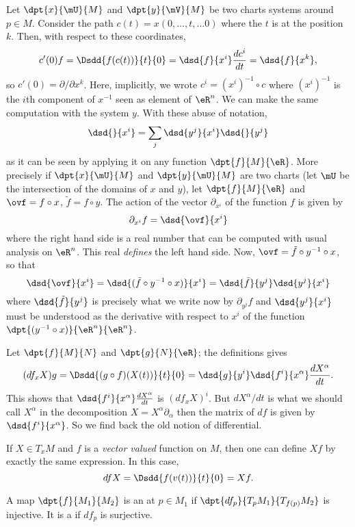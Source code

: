 Let $\dpt{x}{\mU}{M}$ and $\dpt{y}{\mV}{M}$ be two charts systems around $p\in M$. Consider the path $c(t)=x(0,\ldots,t,\ldots 0)$ where the $t$ is at the position $k$. Then, with respect to these coordinates,
\[
  c'(0)f=\Dsdd{ f(c(t))  }{t}{0}=\dsd{f}{x^i}\frac{dc^i}{dt}=\dsd{f}{x^k},
\]
so $c'(0)=\partial/\partial x^k$. Here, implicitly, we wrote $c^i=(x^i)^{-1}\circ c$ where $(x^i)^{-1}$ is the $i$th component of $x^{-1}$ seen as element of $\eR^n$. We can make the same computation with the system $y$. With these abuse of notation,
\begin{equation}
   \dsd{}{x^i}=\sum_j\dsd{y^j}{x^i}\dsd{}{y^j}
\end{equation}
as it can be seen by applying it on any function $\dpt{f}{M}{\eR}$. More precisely if $\dpt{x}{\mU}{M}$ and $\dpt{y}{\mU}{M}$ are two charts (let $\mU$ be the intersection of the domains of $x$ and $y$), let $\dpt{f}{M}{\eR}$ and $\ovf=f\circ x$, $\tilde f =f\circ y$. The action of the vector $\partial_{x^i}$ of the function $f$ is given by
\[
  \partial_{x^i}f=\dsd{\ovf}{x^i}
\]
where the right hand side is a real number that can be computed with usual analysis on $\eR^n$. This real \emph{defines} the left hand side. Now, $\ovf=\tilde f \circ y^{-1}\circ x$, so that
\[
   \dsd{\ovf}{x^i}=\dsd{ (\tilde f \circ y^{-1}\circ x) }{x^i}=\dsd{\tilde f }{y^j}\dsd{y^j}{x^i}
\]
where $\dsd{\tilde f }{y^j}$ is precisely what we write now by $\partial_{y^j}f$ and $\dsd{y^j}{x^i}$ must be understood as the derivative with respect to $x^i$ of the function $\dpt{(y^{-1}\circ x)}{\eR^n}{\eR^n}$.

Let $\dpt{f}{M}{N}$ and $\dpt{g}{N}{\eR}$; the definitions gives
\[
  (df_xX)g=\Dsdd{(g\circ f)(X(t))}{t}{0}
          =\dsd{g}{y^i}\dsd{f^i}{x^{\alpha}}\frac{dX^{\alpha}}{dt}.
\]
This shows that $\dsd{f^i}{x^{\alpha}}\frac{dX^{\alpha}}{dt}$ is $(df_xX)^i$.  But $dX^{\alpha}/dt$ is what we should call $X^{\alpha}$ in the decomposition $X=X^{\alpha}\partial_{\alpha}$ then the matrix of $df$ is given by $\dsd{f^i}{x^{\alpha}}$. So we find back the old notion of differential.

\begin{remark}
If $X\in T_xM$ and $f$ is a \emph{vector valued} function on $M$, then one can define $Xf$ by exactly the same expression. In this case,
\[
  df X=\Dsdd{f(v(t))}{t}{0}=Xf.
\]
\end{remark}

A map $\dpt{f}{M_1}{M_2}$ is an  at $p\in M_1$ if $\dpt{df_p}{T_pM_1}{T_{f(p)}M_2}$ is injective. It is a  if $df_p$ is surjective.

